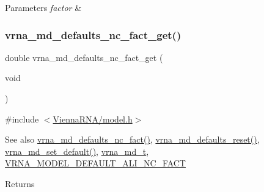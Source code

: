 \begin{DoxyParams}{Parameters}
{\em factor} & \\
\hline
\end{DoxyParams}
\mbox{\label{group__model__details_ga7ac759eaa7159bf5f022745f5da59508}} 
\subsubsection{\texorpdfstring{vrna\_md\_defaults\_nc\_fact\_get()}{vrna\_md\_defaults\_nc\_fact\_get()}}
{\footnotesize\ttfamily double vrna\+\_\+md\+\_\+defaults\+\_\+nc\+\_\+fact\+\_\+get (\begin{DoxyParamCaption}\item[{void}]{ }\end{DoxyParamCaption})}



{\ttfamily \#include $<$\mbox{\hyperlink{model_8h}{Vienna\+R\+N\+A/model.\+h}}$>$}

\begin{DoxySeeAlso}{See also}
\mbox{\hyperlink{group__model__details_gac35e596c850dce3ad55c49119fd7d471}{vrna\+\_\+md\+\_\+defaults\+\_\+nc\+\_\+fact()}}, \mbox{\hyperlink{group__model__details_ga70834424cf804d149937de89f80ceb45}{vrna\+\_\+md\+\_\+defaults\+\_\+reset()}}, \mbox{\hyperlink{group__model__details_ga8ac6ff84936282436f822644bf841f66}{vrna\+\_\+md\+\_\+set\+\_\+default()}}, \mbox{\hyperlink{group__model__details_ga1f8a10e12a0a1915f2a4eff0b28ea17c}{vrna\+\_\+md\+\_\+t}}, \mbox{\hyperlink{group__model__details_ga8f774daaafec28160c1ca5d09f2cbdba}{V\+R\+N\+A\+\_\+\+M\+O\+D\+E\+L\+\_\+\+D\+E\+F\+A\+U\+L\+T\+\_\+\+A\+L\+I\+\_\+\+N\+C\+\_\+\+F\+A\+CT}} 
\end{DoxySeeAlso}
\begin{DoxyReturn}{Returns}

\end{DoxyReturn}
\mbox{\label{group__model__details_ga3f73d3029d3d0025d4cc311510cd95a3}} 
